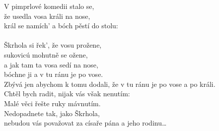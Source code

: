 \nv{}V pimprlové komedii stalo se,\\
že usedla vosa králi na nose,\\
král se namích' a bóch pěstí do stolu:\\
\\
\vinv
Škrhola si řek', že vosu prožene,\\
sukovicú mohutně se ožene,\\
a jak tam ta vosa sedí na nose,\\
bóchne ji a v tu ránu je po vose.\\
\vinv
{}Zbývá jen abychom k tomu dodali, že v tu ránu je po vose a po králi.\\
\vinv
Chtěl bych radit, nijak vás však nenutím:\\
Malé věci řešte ruky mávnutím.\\
Nedopadnete tak, jako Škrhola,\\
nebudou vás považovat za císaře pána a jeho rodinu\dots
\newpage
